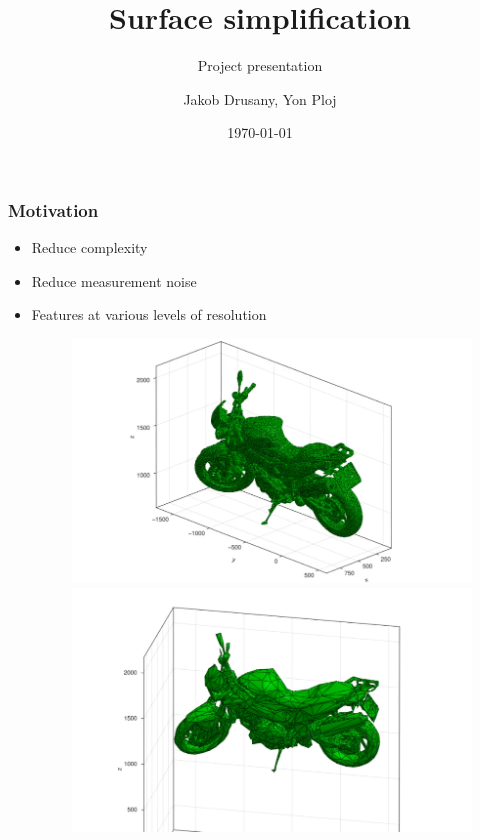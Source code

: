 \documentclass{beamer}
\title{Surface simplification}
\subtitle{Project presentation}
\author{Jakob Drusany, Yon Ploj}
\institute[TDA]{Topological data analysis}
\date{\selectlanguage{slovene}\today}
\begin{document}
\begin{frame}
    \titlepage
\end{frame}

\begin{frame}[t]
    \frametitle{Motivation}
    \begin{itemize}
        \item Reduce complexity
        \item Reduce measurement noise
        \item Features at various levels of resolution
        \begin{figure}
            \begin{minipage}{.5\textwidth}
                \centering
                \includegraphics[width=1\textwidth]{motor_before.png}
            \end{minipage}%
            \begin{minipage}{.5\textwidth}
                \centering
                \includegraphics[width=1\textwidth]{motor_after.png}
            \end{minipage}
        \end{figure}
    \end{itemize}
\end{frame}
\end{document}
